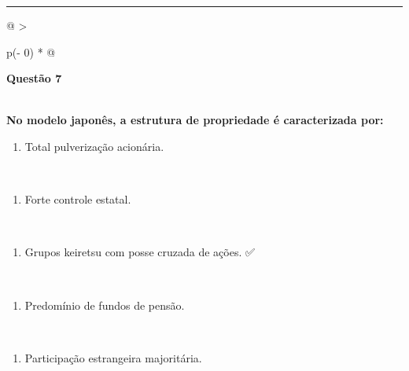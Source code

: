 \documentclass[
]{book}
\providecommand{\tightlist}{%
  \setlength{\itemsep}{0pt}\setlength{\parskip}{0pt}}
\begin{document}
\begin{center}\rule{0.5\linewidth}{0.5pt}\end{center}

\begin{longtable}[]{@{}
  >{\raggedright\arraybackslash}p{(\columnwidth - 0\tabcolsep) * }@{}}
\toprule\noalign{}
\begin{minipage}[b]{\linewidth}\raggedright
\textbf{Questão 7}
\end{minipage} \\
\midrule\noalign{}
\endhead
\bottomrule\noalign{}
\endlastfoot
\textbf{No modelo japonês, a estrutura de propriedade é caracterizada por:} \\
\begin{minipage}[t]{\linewidth}\raggedright
\begin{enumerate}
\def\labelenumi{\alph{enumi})}
\tightlist
\item
  Total pulverização acionária.
\end{enumerate}
\end{minipage} \\
\begin{minipage}[t]{\linewidth}\raggedright
\begin{enumerate}
\def\labelenumi{\alph{enumi})}
\setcounter{enumi}{1}
\tightlist
\item
  Forte controle estatal.
\end{enumerate}
\end{minipage} \\
\begin{minipage}[t]{\linewidth}\raggedright
\begin{enumerate}
\def\labelenumi{\alph{enumi})}
\setcounter{enumi}{2}
\tightlist
\item
  Grupos keiretsu com posse cruzada de ações. ✅
\end{enumerate}
\end{minipage} \\
\begin{minipage}[t]{\linewidth}\raggedright
\begin{enumerate}
\def\labelenumi{\alph{enumi})}
\setcounter{enumi}{3}
\tightlist
\item
  Predomínio de fundos de pensão.
\end{enumerate}
\end{minipage} \\
\begin{minipage}[t]{\linewidth}\raggedright
\begin{enumerate}
\def\labelenumi{\alph{enumi})}
\setcounter{enumi}{4}
\tightlist
\item
  Participação estrangeira majoritária.
\end{enumerate}
\end{minipage} \\
 \\
\end{longtable}
\end{document}
